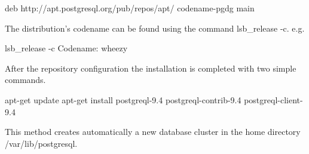 \begin{tinyverbatim}
deb http://apt.postgresql.org/pub/repos/apt/ {codename}-pgdg main
\end{tinyverbatim}


The distribution's codename can be found using the command lsb\_release -c. 
e.g.
\begin{tinyverbatim}
lsb_release -c
Codename: wheezy
\end{tinyverbatim}

After the repository configuration the installation is completed with two simple commands.

\begin{tinyverbatim}
apt-get update
apt-get install postgreql-9.4 postgreql-contrib-9.4 postgreql-client-9.4
\end{tinyverbatim}

This method creates automatically a new database cluster in the home directory /var/lib/postgresql.


